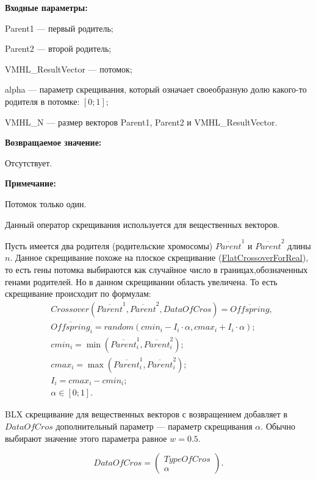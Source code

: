 \textbf{Входные параметры:}
 
Parent1 --- первый родитель;
 
Parent2 --- второй родитель;
 
VMHL\_ResultVector --- потомок;

alpha --- параметр скрещивания, который означает своеобразную долю какого-то родителя в потомке: $[0;1]$;
 
VMHL\_N --- размер векторов Parent1, Parent2 и VMHL\_ResultVector.

\textbf{Возвращаемое значение:}

 Отсутствует.
 
\textbf{ Примечание:}

Потомок только один.
 
Данный оператор скрещивания используется для вещественных векторов.

Пусть имеется два родителя (родительские хромосомы) $ \overline{Parent}^1 $ и $ \overline{Parent}^2$ длины $n$. Данное скрещивание похоже на плоское скрещивание (\hyperref[SetOfOperatorsAlgorithms:FlatCrossoverForReal]{FlatCrossoverForReal}), то есть гены потомка выбираются как случайное число в границах,обозначенных генами родителей. Но в данном скрещивании область увеличена. То есть скрещивание происходит по формулам:
\begin{align}
\label{SetOfOperatorsAlgorithms:eq:BLXCrossoverForReal}
&Crossover \left( \overline{Parent}^1, \overline{Parent}^2, DataOfCros\right)= \overline{Offspring}, \\
& \overline{Offspring}_i=random\left(cmin_i-I_i\cdot \alpha, cmax_i+I_i\cdot \alpha\right);\nonumber\\
& cmin_i = \min\left(\overline{Parent}^1_i, \overline{Parent}^2_i \right);\nonumber\\
& cmax_i = \max\left(\overline{Parent}^1_i, \overline{Parent}^2_i \right);\nonumber\\
& I_i = cmax_i-cmin_i;\nonumber\\
&\alpha\in \left[ 0; 1\right].\nonumber
\end{align}

BLX скрещивание для вещественных векторов с возвращением добавляет в $ DataOfCros $ дополнительный параметр --- параметр скрещивания $ \alpha $. Обычно выбирают значение этого параметра равное $ w=0.5 $.

\begin{equation}
DataOfCros=\left( \begin{array}{c} TypeOfCros \\ \alpha \end{array} \right).
\end{equation}